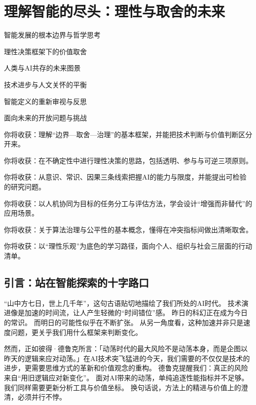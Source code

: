 \chapter{理解智能的尽头：理性与取舍的未来}

\begin{introduction}
\item 智能发展的根本边界与哲学思考
\item 理性决策框架下的价值取舍
\item 人类与AI共存的未来图景
\item 技术进步与人文关怀的平衡
\item 智能定义的重新审视与反思
\item 面向未来的开放问题与挑战
\end{introduction}

\begin{introduction}
\item 你将收获：理解“边界—取舍—治理”的基本框架，并能把技术判断与价值判断区分开来。
\item 你将收获：在不确定性中进行理性决策的思路，包括透明、参与与可逆三项原则。
\item 你将收获：从意识、常识、因果三条线索把握AI的能力与限度，并能提出可检验的研究问题。
\item 你将收获：以人机协同为目标的任务分工与评估方法，学会设计“增强而非替代”的应用场景。
\item 你将收获：关于算法治理与公平性的基本概念，懂得在冲突指标间做出清晰取舍。
\item 你将收获：以“理性乐观”为底色的学习路径，面向个人、组织与社会三层面的行动清单。
\end{introduction}

\section{引言：站在智能探索的十字路口}
“山中方七日，世上几千年”，这句古语贴切地描绘了我们所处的AI时代。
技术演进像是加速的时间流，让人产生轻微的“时间错位”感。
昨日的科幻正在成为今日的常识。
而明日的可能性似乎在不断扩张。
从另一角度看，这种加速并非只是速度问题，更关乎我们用什么框架来判断变化。

然而，正如彼得·德鲁克所言：「动荡时代的最大风险不是动荡本身，而是企图以昨天的逻辑来应对动荡。」在AI技术突飞猛进的今天，我们需要的不仅仅是技术的进步，更需要思维方式的革新和价值观念的重构。
德鲁克提醒我们：真正的风险来自“用旧逻辑应对新变化”。
面对AI带来的动荡，单纯追逐性能指标并不足够。
我们同样需要更新分析工具与价值坐标。
换句话说，方法上的精进与价值上的澄清，必须并行不悖。

